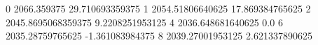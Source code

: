 0 2066.359375 29.710693359375
1 2054.51806640625 17.869384765625
2 2045.8695068359375 9.2208251953125
4 2036.648681640625 0.0
6 2035.28759765625 -1.361083984375
8 2039.27001953125 2.621337890625
